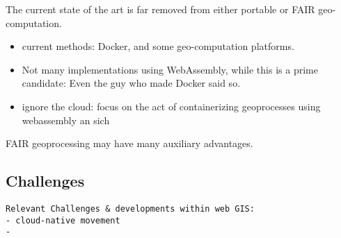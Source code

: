The current state of the art is far removed from either portable or FAIR geo-computation. 
\begin{itemize}
  \item current methods: Docker, and some geo-computation platforms.
  \item Not many implementations using WebAssembly, while this is a prime candidate: Even the guy who made Docker said so. 
  \item ignore the cloud: focus on the act of containerizing geoprocesses using webassembly an sich
\end{itemize}

FAIR geoprocessing may have many auxiliary advantages. 



\subsection{Challenges}
\begin{lstlisting}
Relevant Challenges & developments within web GIS:
- cloud-native movement
- 

\end{lstlisting}


